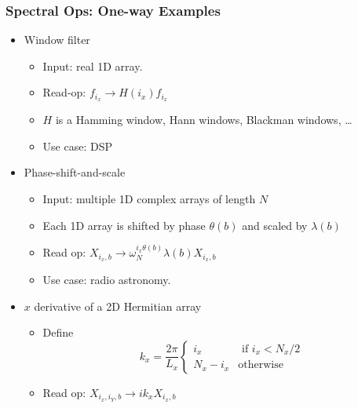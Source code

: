\documentclass[10pt,aspectratio=169]{beamer}
\begin{document}
\begin{frame}
  \frametitle{Spectral Ops: One-way Examples}

  \begin{itemize}
  \item Window filter
    \begin{itemize}
    \item Input: real 1D array.
    \item Read-op: $f_{i_x} \rightarrow H(i_x) f_{i_x}$
    \item $H$ is a Hamming window, Hann windows, Blackman windows, \dots
    \item Use case: DSP
    \end{itemize}

  \item Phase-shift-and-scale
    \begin{itemize}
    \item Input: multiple 1D complex arrays of length $N$
    \item Each 1D array is shifted by phase $\theta(b)$ and scaled by $\lambda(b)$
    \item Read op: $X_{i_x,b} \rightarrow \omega_N^{i_x \theta(b)} \lambda(b)X_{i_x,b}$
    \item Use case: radio astronomy.
    \end{itemize}
  \item $x$ derivative of a 2D Hermitian array
    \begin{itemize}
    \item Define $$k_x= \frac{2 \pi}{L_x}\begin{cases}i_x &\text{ if } i_x < N_x / 2\\ N_x -i_x &\text{otherwise}\end{cases} $$
    \item Read op: $X_{i_x, i_Y,b} \rightarrow i k_x  X_{i_x,b}$
    \end{itemize}
  \end{itemize}
  
\end{frame}
\end{document}
